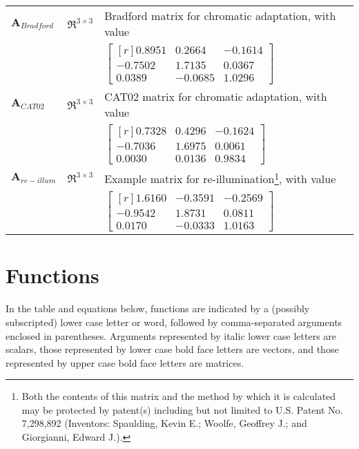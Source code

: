 {\begin{tabularx}{\textwidth}{|l|l|X|}
	$\mathbf{A}_{Bradford}$ & $\Re^{3\times3}$ & Bradford matrix for chromatic adaptation, with value \\
	& & 
		$\begin{bmatrix*}[r]
			0.8951 & 0.2664 & -0.1614 \\
			-0.7502 & 1.7135 & 0.0367 \\
			0.0389 & -0.0685 & 1.0296 
		\end{bmatrix*}$ \\ \hline
	$\mathbf{A}_{CAT02}$ & $\Re^{3\times3}$ & CAT02 matrix for chromatic adaptation, with value \\
	& &
		$\begin{bmatrix*}[r]
			0.7328 & 0.4296 & -0.1624 \\
			-0.7036 & 1.6975 & 0.0061 \\
			0.0030 & 0.0136 & 0.9834 
		\end{bmatrix*}$ \\ \hline
	$\mathbf{A}_{re-illum}$ & $\Re^{3\times3}$ & Example matrix for re-illumination\footnote{Both the contents of this matrix and the method by which it is calculated may be protected by patent(s) including but not limited to U.S. Patent No. 7,298,892 (Inventors: Spaulding, Kevin E.; Woolfe, Geoffrey J.; and Giorgianni, Edward J.).}, with value \\
	& &
		$\begin{bmatrix*}[r]
			1.6160 & -0.3591 & -0.2569 \\
			-0.9542 & 1.8731 & 0.0811 \\
			0.0170 & -0.0333 & 1.0163 
		\end{bmatrix*}$ \\ \hline
\end{tabularx}
}

\section{Functions}
\label{sec:functions}
In the table and equations below, functions are indicated by a (possibly subscripted) lower case letter or word, followed by comma-separated arguments enclosed in parentheses. Arguments represented by italic lower case letters are scalars, those represented by lower case bold face letters are vectors, and those represented by upper case bold face letters are matrices.

